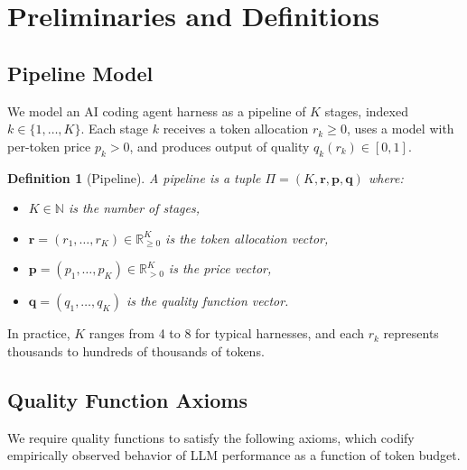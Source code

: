 \documentclass[11pt, a4paper, logo, copyright]{googledeepmind}
\newtheorem{definition}{Definition}[section]
\begin{document}
\section{Preliminaries and Definitions}\label{sec:prelim}

\subsection{Pipeline Model}

We model an AI coding agent harness as a pipeline of $K$ stages, indexed $k \in \{1, \ldots, K\}$. Each stage $k$ receives a token allocation $r_k \geq 0$, uses a model with per-token price $p_k > 0$, and produces output of quality $q_k(r_k) \in [0, 1]$.

\begin{definition}[Pipeline]\label{def:pipeline}
A \emph{pipeline} is a tuple $\Pi = (K, \mathbf{r}, \mathbf{p}, \mathbf{q})$ where:
\begin{itemize}[nosep]
    \item $K \in \mathbb{N}$ is the number of stages,
    \item $\mathbf{r} = (r_1, \ldots, r_K) \in \mathbb{R}_{\geq 0}^K$ is the token allocation vector,
    \item $\mathbf{p} = (p_1, \ldots, p_K) \in \mathbb{R}_{> 0}^K$ is the price vector,
    \item $\mathbf{q} = (q_1, \ldots, q_K)$ is the quality function vector.
\end{itemize}
\end{definition}

In practice, $K$ ranges from 4 to 8 for typical harnesses, and each $r_k$ represents thousands to hundreds of thousands of tokens.

\subsection{Quality Function Axioms}

We require quality functions to satisfy the following axioms, which codify empirically observed behavior of LLM performance as a function of token budget.
\end{document}

